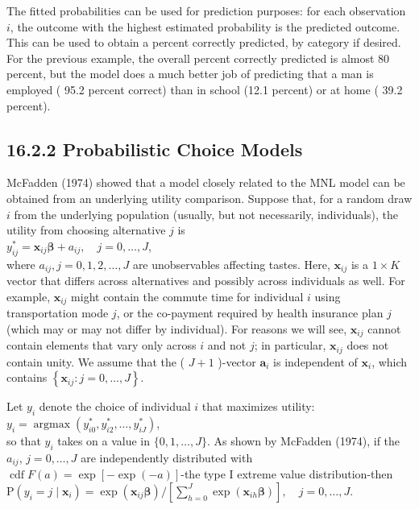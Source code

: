 \documentclass[10pt]{article}
\begin{document}
The fitted probabilities can be used for prediction purposes: for each observation $i$, the outcome with the highest estimated probability is the predicted outcome. This can be used to obtain a percent correctly predicted, by category if desired. For the previous example, the overall percent correctly predicted is almost 80 percent, but the model does a much better job of predicting that a man is employed ( 95.2 percent correct) than in school (12.1 percent) or at home ( 39.2 percent).

\subsection*{16.2.2 Probabilistic Choice Models}
McFadden (1974) showed that a model closely related to the MNL model can be obtained from an underlying utility comparison. Suppose that, for a random draw $i$ from the underlying population (usually, but not necessarily, individuals), the utility from choosing alternative $j$ is\\
$y_{i j}^{*}=\mathbf{x}_{i j} \boldsymbol{\beta}+a_{i j}, \quad j=0, \ldots, J$,\\
where $a_{i j}, j=0,1,2, \ldots, J$ are unobservables affecting tastes. Here, $\mathbf{x}_{i j}$ is a $1 \times K$ vector that differs across alternatives and possibly across individuals as well. For example, $\mathbf{x}_{i j}$ might contain the commute time for individual $i$ using transportation mode $j$, or the co-payment required by health insurance plan $j$ (which may or may not differ by individual). For reasons we will see, $\mathbf{x}_{i j}$ cannot contain elements that vary only across $i$ and not $j$; in particular, $\mathbf{x}_{i j}$ does not contain unity. We assume that the ( $J+1$ )-vector $\mathbf{a}_{i}$ is independent of $\mathbf{x}_{i}$, which contains $\left\{\mathbf{x}_{i j}: j=0, \ldots, J\right\}$.

Let $y_{i}$ denote the choice of individual $i$ that maximizes utility:\\
$y_{i}=\operatorname{argmax}\left(y_{i 0}^{*}, y_{i 2}^{*}, \ldots, y_{i J}^{*}\right)$,\\
so that $y_{i}$ takes on a value in $\{0,1, \ldots, J\}$. As shown by McFadden (1974), if the $a_{i j}$, $j=0, \ldots, J$ are independently distributed with $\operatorname{cdf} F(a)=\exp [-\exp (-a)]$-the type I extreme value distribution-then\\
$\mathrm{P}\left(y_{i}=j \mid \mathbf{x}_{i}\right)=\exp \left(\mathbf{x}_{i j} \boldsymbol{\beta}\right) /\left[\sum_{h=0}^{J} \exp \left(\mathbf{x}_{i h} \boldsymbol{\beta}\right)\right], \quad j=0, \ldots, J$.
\end{document}
